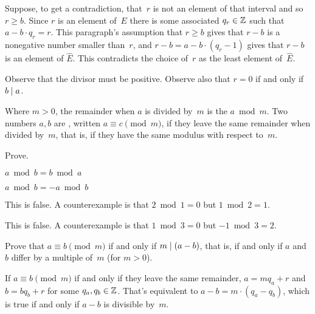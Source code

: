 \documentclass{ibl}  %
\begin{document}
\begin{problem}
\begin{exes}
\begin{answer}
  Suppose, to get a contradiction, that~$r$ is not 
  an element of that interval and so $r\geq b$.
  Since $r$ is an element of~$E$ there is some associated
  $q_r\in\mathbb{Z}$ such that $a-b\cdot q_r=r$.
  This paragraph's assumption that $r\geq b$
  gives that $r-b$ is a nonegative number smaller than~$r$, and
  $r-b=a-b\cdot (q_r-1)$ gives that $r-b$ is an element of $\hat{E}$.
  This contradicts the choice of~$r$ as the least element of~$\hat{E}$.
\end{answer}
\end{exes}
\end{problem}

\noindent 
Observe that the divisor must be positive.
Observe also that $r=0$ if and only if $b\mid a$. 

\begin{df}
Where $m>0$, the remainder when $a$ is divided by~$m$ is
the  $a\bmod m$.
Two numbers $a,b$ are , 
written $a\equiv c\pmod m$, 
if they leave the same remainder when divided by~$m$, that is,
if they have the same modulus with respect to~$m$.
\end{df}

\begin{problem}[\midlength] Prove.  %
\begin{items}
\item $a\bmod b=b\bmod a$
\item $a\bmod b=-a\bmod b$
\end{items}
\begin{ans}
\begin{exes}
\item This is false.
  A counterexample is that $2\bmod 1=0$ but $1\bmod 2=1$.
\item This is false.
  A counterexample is that $1\bmod 3=0$ but $-1\bmod 3=2$.
\end{exes}
\end{ans}
\end{problem}

\begin{problem} \label{ex:AEquivBpmodMIFFABDifferBYMultipleOfM}
Prove that $a\equiv b\pmod m$ if and only if $m\mid (a-b)$,
that is, if and only if $a$ and~$b$ differ by a multiple of~$m$
(for $m>0$).  
\begin{answer}
If $a\equiv b\pmod m$ if and only if they leave the same remainder,
$a=mq_a+r$ and~$b=bq_b+r$ for some $q_a,q_b\in\mathbb{Z}$.
That's equivalent to $a-b=m\cdot(q_a-q_b)$, 
which is true if and only if $a-b$ is divisible by~$m$.
\end{answer}
\end{problem}
\end{document}
